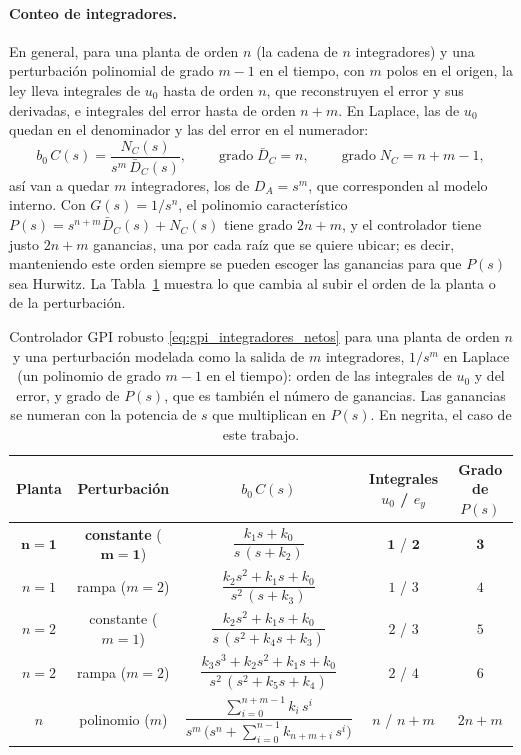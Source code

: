 \paragraph{Conteo de integradores.} En general, para una planta de orden
$n$ (la cadena de $n$ integradores) y una perturbación polinomial de grado $m - 1$ en el tiempo,
con $m$ polos en el origen, la ley lleva integrales de $u_0$ hasta de orden $n$, que reconstruyen el
error y sus derivadas, e integrales del error hasta de orden $n + m$. En Laplace,
las de $u_0$ quedan en el denominador y las del error en el numerador:
\begin{equation}
b_0\,C(s) = \frac{N_C(s)}{s^{m}\,\bar{D}_C(s)} ,
\qquad \operatorname{grado} \bar{D}_C = n ,
\qquad \operatorname{grado} N_C = n + m - 1 ,
\label{eq:gpi_integradores_netos}
\end{equation}
así van a quedar $m$ integradores, los de $D_A = s^{m}$, que corresponden al modelo interno. Con
$G(s) = 1/s^{n}$, el polinomio característico $P(s) = s^{n+m}\bar{D}_C(s) + N_C(s)$ tiene grado
$2n + m$, y el controlador tiene justo $2n + m$ ganancias, una por cada raíz que se quiere ubicar; es
decir, manteniendo este orden siempre se pueden escoger las ganancias para que $P(s)$ sea Hurwitz. La
Tabla~\ref{tab:gpi_conteo} muestra lo que cambia al subir el orden de la planta o
de la perturbación.

\begin{table}[H]
\centering
\caption[Integradores del GPI según la planta y la perturbación]{Controlador GPI robusto
  \eqref{eq:gpi_integradores_netos} para una planta de orden $n$ y una
  perturbación modelada como la salida de $m$ integradores, $1/s^{m}$ en Laplace (un
  polinomio de grado $m - 1$ en el tiempo): orden de las integrales de $u_0$ y
  del error, y grado de $P(s)$, que es también el número de ganancias. Las
  ganancias se numeran con la potencia de $s$ que multiplican en $P(s)$. En
  negrita, el caso de este trabajo.}
\label{tab:gpi_conteo}
\small
\renewcommand{\arraystretch}{2.2}
\setlength{\tabcolsep}{4.5pt}
\begin{tabular}{ccccc}
\toprule
\textbf{Planta} & \textbf{Perturbación} & $b_0\,C(s)$ & \textbf{Integrales} $u_0$ / $e_y$ & \textbf{Grado de} $P(s)$ \\
\midrule
$\mathbf{n = 1}$ & \textbf{constante} ($\mathbf{m = 1}$) & $\dfrac{k_1 s + k_0}{s\,(s + k_2)}$ & $\mathbf{1}$ / $\mathbf{2}$ & $\mathbf{3}$ \\
$n = 1$ & rampa ($m = 2$) & $\dfrac{k_2 s^2 + k_1 s + k_0}{s^2\,(s + k_3)}$ & $1$ / $3$ & $4$ \\
$n = 2$ & constante ($m = 1$) & $\dfrac{k_2 s^2 + k_1 s + k_0}{s\,(s^2 + k_4 s + k_3)}$ & $2$ / $3$ & $5$ \\
$n = 2$ & rampa ($m = 2$) & $\dfrac{k_3 s^3 + k_2 s^2 + k_1 s + k_0}{s^2\,(s^2 + k_5 s + k_4)}$ & $2$ / $4$ & $6$ \\
\midrule
$n$ & polinomio ($m$) & $\dfrac{\sum_{i=0}^{n+m-1} k_i\,s^{i}}{s^{m}\,\bigl(s^{n} + \sum_{i=0}^{n-1} k_{n+m+i}\,s^{i}\bigr)}$ & $n$ / $n + m$ & $2n + m$ \\
\bottomrule
\end{tabular}
\end{table}

